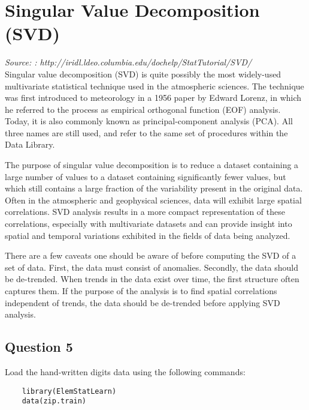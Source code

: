 \newpage
\section{Singular Value Decomposition (SVD)}
\textit{Source: : http://iridl.ldeo.columbia.edu/dochelp/StatTutorial/SVD/ \\}
Singular value decomposition (SVD) is quite possibly the most widely-used multivariate statistical technique used in the atmospheric sciences. The technique was first introduced to meteorology in a 1956 paper by Edward Lorenz, in which he referred to the process as empirical orthogonal function (EOF) analysis. Today, it is also commonly known as principal-component analysis (PCA). All three names are still used, and refer to the same set of procedures within the Data Library. 


The purpose of singular value decomposition is to reduce a dataset containing a large number of values to a dataset containing significantly fewer values, but which still contains a large fraction of the variability present in the original data. Often in the atmospheric and geophysical sciences, data will exhibit large spatial correlations. SVD analysis results in a more compact representation of these correlations, especially with multivariate datasets and can provide insight into spatial and temporal variations exhibited in the fields of data being analyzed. 


There are a few caveats one should be aware of before computing the SVD of a set of data. First, the data must consist of anomalies. Secondly, the data should be de-trended. When trends in the data exist over time, the first structure often captures them. If the purpose of the analysis is to find spatial correlations independent of trends, the data should be de-trended before applying SVD analysis. 

\newpage

\subsection*{Question 5}
Load the hand-written digits data using the following commands:

\begin{framed}
	\begin{verbatim}
	library(ElemStatLearn)
	data(zip.train)
	\end{verbatim}
\end{framed}

